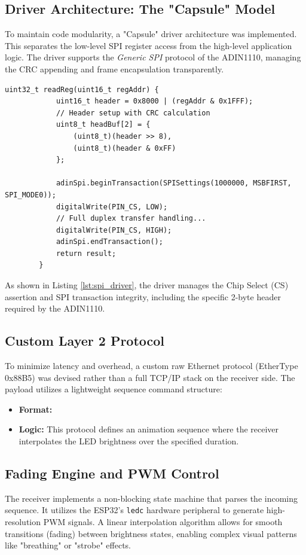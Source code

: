 \documentclass[conference]{IEEEtran}
\begin{document}
	\subsection{Driver Architecture: The "Capsule" Model}
	To maintain code modularity, a "Capsule" driver architecture was implemented. This separates the low-level SPI register access from the high-level application logic. The driver supports the \textit{Generic SPI} protocol of the ADIN1110, managing the CRC appending and frame encapsulation transparently.
	
	\begin{lstlisting}[caption={Low-Level Register Access Implementation}, label={lst:spi_driver}]
		uint32_t readReg(uint16_t regAddr) {
			uint16_t header = 0x8000 | (regAddr & 0x1FFF);
			// Header setup with CRC calculation
			uint8_t headBuf[2] = { 
				(uint8_t)(header >> 8), 
				(uint8_t)(header & 0xFF) 
			};
			
			adinSpi.beginTransaction(SPISettings(1000000, MSBFIRST, SPI_MODE0));
			digitalWrite(PIN_CS, LOW);
			// Full duplex transfer handling...
			digitalWrite(PIN_CS, HIGH);
			adinSpi.endTransaction();
			return result;
		}
	\end{lstlisting}
	
	As shown in Listing \ref{lst:spi_driver}, the driver manages the Chip Select (CS) assertion and SPI transaction integrity, including the specific 2-byte header required by the ADIN1110.
	
	\subsection{Custom Layer 2 Protocol}
	To minimize latency and overhead, a custom raw Ethernet protocol (EtherType 0x88B5) was devised rather than a full TCP/IP stack on the receiver side. The payload utilizes a lightweight sequence command structure:
	\begin{itemize}
		\item \textbf{Format:} 
		\item \textbf{Logic:} This protocol defines an animation sequence where the receiver interpolates the LED brightness over the specified duration.
	\end{itemize}
	
	\subsection{Fading Engine and PWM Control}
	The receiver implements a non-blocking state machine that parses the incoming sequence. It utilizes the ESP32's \texttt{ledc} hardware peripheral to generate high-resolution PWM signals. A linear interpolation algorithm allows for smooth transitions (fading) between brightness states, enabling complex visual patterns like "breathing" or "strobe" effects.
	
\end{document}
